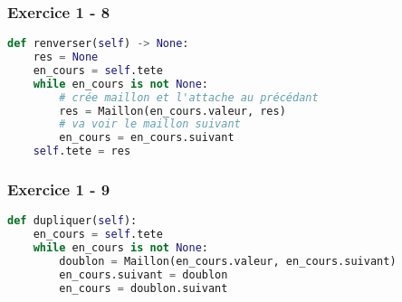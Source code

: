 \documentclass[svgnames,11pt]{beamer}
\begin{document}
\begin{frame}[fragile]
    \frametitle{Exercice 1 - 8}

\begin{lstlisting}[language=Python , basicstyle=\ttfamily\small, xleftmargin=2em, xrightmargin=2em]
def renverser(self) -> None:
    res = None
    en_cours = self.tete
    while en_cours is not None:
        # crée maillon et l'attache au précédant
        res = Maillon(en_cours.valeur, res)
        # va voir le maillon suivant
        en_cours = en_cours.suivant
    self.tete = res
\end{lstlisting}

\end{frame}
\begin{frame}[fragile]
    \frametitle{Exercice 1 - 9}

\begin{lstlisting}[language=Python , basicstyle=\ttfamily\small, xleftmargin=2em, xrightmargin=2em]
def dupliquer(self):
    en_cours = self.tete
    while en_cours is not None:
        doublon = Maillon(en_cours.valeur, en_cours.suivant)
        en_cours.suivant = doublon
        en_cours = doublon.suivant
\end{lstlisting}

\end{frame}
\end{document}
